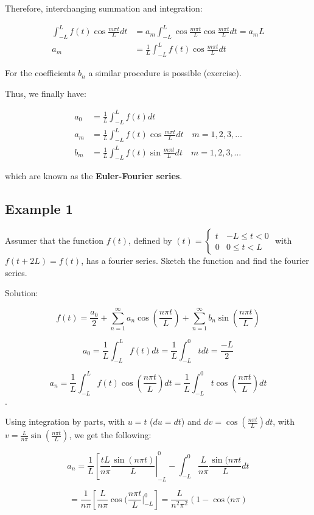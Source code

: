 \documentclass{article}
\begin{document}
Therefore, interchanging summation and integration:

$$
\begin{aligned}
\int_{-L}^{L} f(t) \cos \frac{m \pi t}{L} d t &=a_{m} \int_{-L}^{L} \cos \frac{m \pi t}{L} \cos \frac{m \pi t}{L} d t=a_{m} L \\
a_{m} &=\frac{1}{L} \int_{-L}^{L} f(t) \cos \frac{m \pi t}{L} d t
\end{aligned}
$$

For the coefficients $b_n$ a similar procedure is possible (exercise). 

Thus, we finally have:

$$
\begin{aligned}
a_{0} &=\frac{1}{L} \int_{-L}^{L} f(t) d t \\
a_{m} &=\frac{1}{L} \int_{-L}^{L} f(t) \cos \frac{m \pi t}{L} d t \quad m=1,2,3, \ldots \\
b_{m} &=\frac{1}{L} \int_{-L}^{L} f(t) \sin \frac{m \pi t}{L} d t \quad m=1,2,3, \ldots
\end{aligned}
$$

which are known as the \textbf{Euler-Fourier series}. 

\subsection{Example 1}
\begin{center}
    Assumer that the function $f(t)$, defined by $(t) = \left\{ \begin{matrix} t & -L \leq t < 0 \\ 0 & 0 \leq t < L \end{matrix} \right.$ with $ f(t + 2L) = f(t)$, has a fourier series. Sketch the function and find the fourier series. 
\end{center}

Solution:

$$f(t) = \frac{a_0}{2} + \sum_{n = 1}^\infty a_n \cos(\frac{n \pi t}{L}) + \sum_{n = 1}^\infty b_n \sin(\frac{n \pi t}{L})$$

$$a_0 = \frac{1}{L} \int_{-L}^L f(t) dt = \frac{1}{L} \int_{-L}^0 t dt = \frac{-L}{2}$$

$$a_n = \frac{1}{L} \int_{-L}^L f(t) \cos(\frac{n \pi t}{L}) dt = \frac{1}{L} \int_{-L}^0 t \cos (\frac{n \pi t}{L}) dt$$. 

Using integration by parts, with $u = t$ ($du = dt$) and $dv = \cos(\frac{n \pi t}{L}) dt$, with $v = \frac{L}{n \pi} \sin(\frac{n \pi t}{L})$, we get the following:

$$a_n = \frac{1}{L} \left[\frac{tL}{n \pi} \frac{\sin(n \pi t)}{L} \right|_{-L}^0 - \int_{-L}^{0} \frac{L}{n \pi} \frac{\sin(n \pi t}{L} dt$$

$$ = \frac{1}{n \pi} \left[ \frac{L}{n \pi} \cos(\frac{n \pi t}{L} |_{-L}^{0} \right] = \frac{L}{n^2 \pi^2} \left(1 - \cos(n \pi \right)$$
\end{document}
